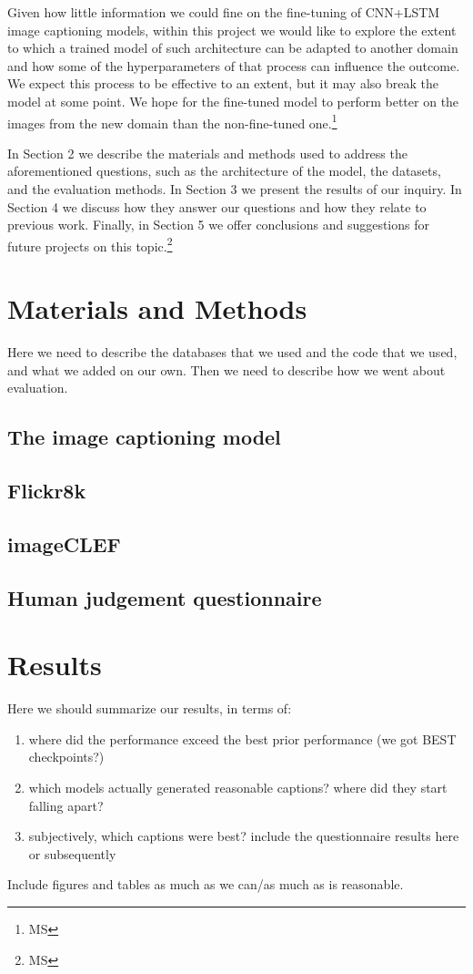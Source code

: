\documentclass[11pt]{article}
\begin{document}
Given how little information we could fine on the fine-tuning of CNN+LSTM image captioning models, within this project we would like to explore the extent to which a trained model of such architecture can be adapted to another domain and how some of the hyperparameters of that process can influence the outcome. We expect this process to be effective to an extent, but it may also break the model at some point. We hope for the fine-tuned model to perform better on the images from the new domain than the non-fine-tuned one.\footnote{MS} 

In Section 2 we describe the materials and methods used to address the aforementioned questions, such as the architecture of the model, the datasets, and the evaluation methods. In Section 3 we present the results of our inquiry. In Section 4 we discuss how they answer our questions and how they relate to previous work. Finally, in Section 5 we offer conclusions and suggestions for future projects on this topic.\footnote{MS}

\section{Materials and Methods}

Here we need to describe the databases that we used and the code that we used, and what we added on our own. Then we need to describe how we went about evaluation.

\subsection{The image captioning model}
\subsection{Flickr8k}
\subsection{imageCLEF}
\subsection{Human judgement questionnaire}

\section{Results}

Here we should summarize our results, in terms of:
\begin{enumerate}
    \item where did the performance exceed the best prior performance (we got BEST checkpoints?)
    \item which models actually generated reasonable captions? where did they start falling apart?
    \item subjectively, which captions were best? include the questionnaire results here or subsequently
\end{enumerate}
Include figures and tables as much as we can/as much as is reasonable.
\end{document}
